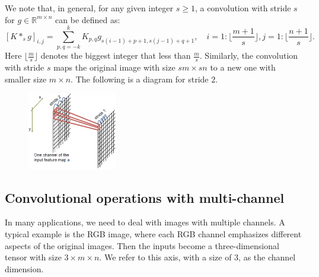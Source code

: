 We note that, in general, for any given integer $s\ge1$, a convolution with stride
$s$ for $g \in \mathbb{R}^{m\times n}$  can be  defined as:
	\begin{equation}\label{stride}
	[K \ast_s g]_{i,j} = \sum_{p,q=-k}^k K_{p,q} g_{s(i-1) + p+1, s(j-1) + q+1},  
	\quad i = 1: \lfloor  \frac{m+1}{s}\rfloor, j = 1: \lfloor  \frac{n+1}{s}\rfloor.
	\end{equation}
	Here $ \lfloor  \frac{m}{s}\rfloor$ denotes the biggest integer that less than $\frac{m}{s}$. Similarly, the convolution with stride $s$ maps the original image with size $sm\times sn$ to a new one with smaller size $m\times n$.
	The following is a diagram for stride $2$.
\begin{figure}[H]
\begin{center}
	\includegraphics[width=0.35\textwidth]{figures/PoolingLayer1}
\end{center}
\end{figure}

\subsection{Convolutional operations with multi-channel}
In many applications, we need to deal with images with multiple channels. A typical example is the RGB image, where each RGB channel emphasizes different aspects of the original images. Then the inputs become a three-dimensional tensor with size $3\times m\times n$. We refer to this axis, with a size of 3, as the channel dimension. 

